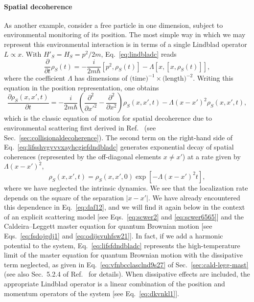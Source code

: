 \documentclass[3p,sort&compress,12pt]{elsarticle}
\providecommand{\abs}[1]{\left\lvert#1\right\rvert}
\newcommand{\I}{\ensuremath{i}}
\newcommand{\op}[1]{#1}
\begin{document}
\paragraph{Spatial decoherence} As another example, consider a free particle in one dimension, subject to environmental monitoring of its position. The most simple way in which we may represent this environmental interaction is in terms of a single Lindblad operator $L \propto \op{x}$. With $\op{H}'_S = \op{H}_S = p^2/2m$, Eq.~\eqref{eq:lindbladc} reads
%
\begin{equation}\label{eq:lifsfdndbladc}
\frac{\partial}{\partial t} \op{\rho}_S(t) =  -\frac{\I}{2m\hbar}\left[p^2, \op{\rho}_S(t) \right] - \Lambda \left[ x, \left[ x, \op{\rho}_S(t) \right]\right],
\end{equation}
%
where the coefficient $\Lambda$ has dimensions of $\text{(time)}^{-1} \times \text{(length)}^{-2}$. Writing this equation in the position representation, one obtains
%
\begin{equation}\label{eq:lifsshvgvvvxayhcgiefdndbladc}
  \frac{\partial \op{\rho}_S(x,x',t)}{\partial t} = - \frac{\I}{2m\hbar} \left(\frac{ \partial^2}{\partial x'^2}- \frac{ \partial^2}{\partial x^2} \right) \op{\rho}_S(x,x',t) -  \Lambda
  \left(x-x'\right)^2   \op{\rho}_S(x,x',t),
\end{equation}
%
which is the classic equation of motion for spatial decoherence due to environmental scattering first derived in Ref.~\cite{Joos:1985:iu} (see Sec.~\ref{sec:collisionaldecoherence}). The second term on the right-hand side of Eq.~\eqref{eq:lifsshvgvvvxayhcgiefdndbladc} generates exponential decay of spatial coherences (represented by the off-diagonal elements $x\not= x'$) at a rate given by $ \Lambda \left(x-x'\right)^2$, 
%
\begin{equation}
\rho_S(x,x',t) =\rho_S(x,x',0) \exp\left[-\Lambda (x-x')^2 t\right],
\end{equation}
%
where we have neglected the intrinsic dynamics. We see that the localization rate depends on the square of the separation $\abs{x-x'}$. We have already encountered this dependence in Eq.~\eqref{eq:daf12}, and we will find it again below in the context of an explicit scattering model [see Eqs.~\eqref{eq:scwer2}
 and \eqref{eq:scwer6565}] and the Caldeira--Leggett master equation for quantum Brownian motion [see Eqs.~\eqref{eq:fsdojgdj1} and \eqref{eq:odijsvuhfsw21}]. In fact, if we add a harmonic potential to the system, Eq.~\eqref{eq:lifsfdndbladc} represents the high-temperature limit of the master equation for quantum Brownian motion with the dissipative term neglected, as given in Eq.~\eqref {eq:vfnbcclasclnd9s27} of Sec.~\ref{sec:cald-legg-mast} (see also Sec.~5.2.4 of Ref.~\cite{Schlosshauer:2007:un} for details). When dissipative effects are included, the appropriate Lindblad operator is a linear combination of the position and momentum operators of the system [see Eq.~\eqref{eq:dkvnkl1}].
\end{document}

